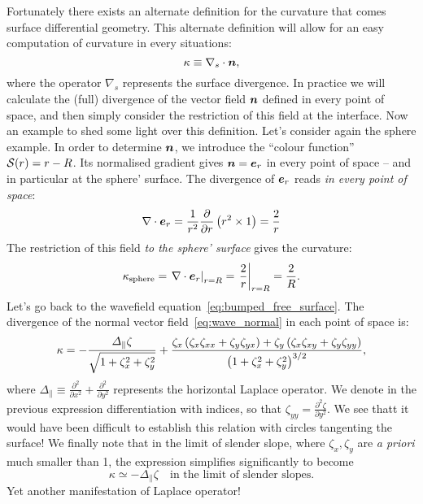 Fortunately there exists an alternate definition for the curvature that comes surface differential geometry. This alternate definition will allow for an easy computation of curvature in every situations:
\begin{equation}
\kappa \equiv \nabla_s \cdot \bn,
\end{equation}
where the operator $\nabla_s$ represents the surface divergence. In practice we will calculate the (full) divergence of the vector field $\bn$ defined in every point of space, and then simply consider the restriction of this field at the interface. Now an example to shed some light over this definition.
 Let's consider again the sphere example. In order to determine $\bn$, we introduce the ``colour function'' $\mathcal S(r) = r - R$. Its normalised gradient gives $\bn = \be_r$ in every point of space -- and in particular at the sphere' surface. The divergence of $\be_r$ reads \textit{in every point of space}:
\begin{equation}
\nabla \cdot \be_r = \frac{1}{r^2} \pd{}{r} \lp r^2 \times 1 \rp = \frac{2}{r}
\end{equation}
The restriction of this field \textit{to the sphere' surface} gives the curvature:
\begin{equation}
\kappa_\text{sphere} = \left.\nabla \cdot \be_r\right|_{r=R} = \left.\frac{2}{r}\right|_{r=R} = \frac{2}{R}.
\end{equation}
 Let's go back to the wavefield equation~\eqref{eq:bumped_free_surface}. The divergence of the normal vector field~\eqref{eq:wave_normal} in each point of space is:
\begin{equation}
\kappa= -\frac{\Delta_\parallel \zeta}{\sqrt{1+\zeta_x^2+\zeta_y^2}} + \frac{\zeta_x\left(\zeta_x \zeta_{xx} + \zeta_y \zeta_{yx}\right) + \zeta_y\left(\zeta_x \zeta_{xy} + \zeta_y \zeta_{yy}\right)}{\left( 1+\zeta_x^2+\zeta_y^2\right)^{3/2}},
\end{equation}
where $\Delta_\parallel \equiv \frac{\partial^2}{\partial x^2} + \frac{\partial^2}{\partial y^2}$ represents the horizontal Laplace operator. We denote in the previous expression differentiation with indices, so that $ \zeta_{yy} = \frac{\partial^2\zeta}{\partial y^2}$. We see thatt it would have been difficult to establish this relation with circles tangenting the surface! We finally note that in the limit of slender slope, where $\zeta_x,\zeta_y$ are \textit{a priori} much smaller than 1, the expression simplifies significantly to become
\begin{equation}
\kappa \simeq - \Delta_\parallel \zeta \quad \text{in the limit of slender slopes}.
\end{equation}
Yet another manifestation of Laplace operator!
